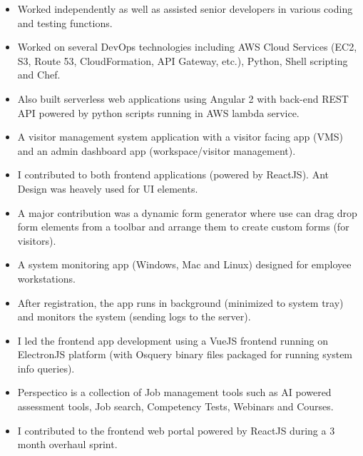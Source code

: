 \documentclass[10pt,a4paper,ragged2e]{altacv}
\begin{document}
\divider

\begin{itemize}
\item Worked independently as well as assisted senior developers in various coding and testing functions. 
\smallskip
\item Worked on several DevOps technologies including AWS Cloud Services (EC2, S3, Route 53,
CloudFormation, API Gateway, etc.), Python, Shell scripting and Chef. 
\smallskip
\item Also built serverless web applications using Angular 2 with back-end REST API powered by python scripts running in
AWS lambda service.
\end{itemize}



\begin{itemize}
\item A visitor management system application with a visitor facing app (VMS) and an admin dashboard app (workspace/visitor management).
\item I contributed to both frontend applications (powered by ReactJS). Ant Design was heavely used for UI elements. 
\item A major contribution was a dynamic form generator where use can drag drop form elements from a toolbar and arrange them to create custom forms (for visitors).
\end{itemize}
\smallskip
\smallskip 


\begin{itemize}
\item A system monitoring app (Windows, Mac and Linux) designed for employee workstations.
\item After registration, the app runs in background (minimized to system tray) and monitors the system (sending logs to the server).
\item I led the frontend app development using a VueJS frontend running on ElectronJS platform (with Osquery binary files packaged for running system info queries).
\end{itemize}
\smallskip
\smallskip


\begin{itemize}
\item Perspectico is a collection of Job management tools such as AI powered assessment tools, Job search, Competency Tests, Webinars and Courses.
\item I contributed to the frontend web portal powered by ReactJS during a 3 month overhaul sprint. 
\end{itemize}
\smallskip
\smallskip 
\end{document}
